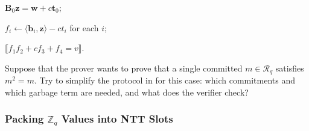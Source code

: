 \documentclass[../../book.tex]{subfiles}
\begin{document}
\begin{algoproto}[ht]
\begin{mdframed}[linecolor=black, linewidth=1pt,
                     skipabove=10pt, skipbelow=10pt,
                     innerleftmargin=5pt, innerrightmargin=5pt]
\begin{minipage}[t]{0.44\linewidth}
\begin{algoen}
                \item {} $\mathbf{B}_0\mathbf{z} = \mathbf{w} + c\mathbf{t}_0$;
                \item $f_i \gets \langle \mathbf{b}_i, \mathbf{z} \rangle - ct_i$ for each $i$;
                \item {} $\llbracket f_1f_2 + cf_3 + f_4 = v \rrbracket$.
            \end{algoen}
        \end{minipage}
    \end{mdframed}
    \caption{The ALS20 product proof~\cite{C:AttLyuSei20} for $m_1m_2 = m_3$ over $\mathcal{R}_q$, in its simplest form. Compared to the opening proof in , the prover sends one additional commitment $t_4$ and one additional element $v \in \mathcal{R}_q$.}
    \label{fig:als20-product}
\end{algoproto}

\begin{exercise}\label{exercise:idempotent-proof}
    Suppose that the prover wants to prove that a single committed $m \in \mathcal{R}_q$ satisfies $m^2 = m$.
    Try to simplify the protocol in  for this case: which commitments and which garbage term are needed, and what does the verifier check?
\end{exercise}

\subsubsection{Packing $\mathbb{Z}_q$ Values into NTT Slots}
\end{document}
